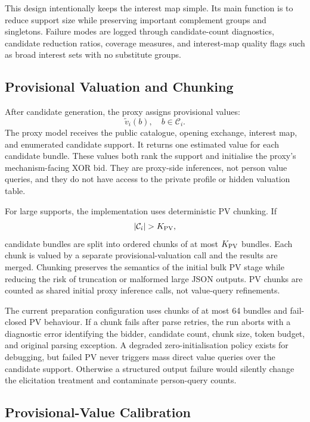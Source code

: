 This design intentionally keeps the interest map simple. Its main function is to reduce support size while preserving important complement groups and singletons. Failure modes are logged through candidate-count diagnostics, candidate reduction ratios, coverage measures, and interest-map quality flags such as broad interest sets with no substitute groups.

\subsection{Provisional Valuation and Chunking}

After candidate generation, the proxy assigns provisional values:
\[
\tilde v_i(b),\quad b\in\mathcal{C}_i.
\]
The proxy model receives the public catalogue, opening exchange, interest
map, and enumerated candidate support. It returns one estimated value for
each candidate bundle. These values both rank the support and initialise the
proxy's mechanism-facing XOR bid. They are proxy-side inferences, not person
value queries, and they do not have access to the private profile or hidden
valuation table.

For large supports, the implementation uses deterministic PV chunking. If
\[
|\mathcal{C}_i|>K_{\PV},
\]
candidate bundles are split into ordered chunks of at most \(K_{\operatorname{PV}}\) bundles. Each chunk is valued by a separate provisional-valuation call and the results are merged. Chunking preserves the semantics of the initial bulk PV stage while reducing the risk of truncation or malformed large JSON outputs. PV chunks are counted as shared initial proxy inference calls, not value-query refinements.

The current preparation configuration uses chunks of at most 64 bundles and
fail-closed PV behaviour. If a chunk fails after parse retries, the run
aborts with a diagnostic error identifying the bidder, candidate count,
chunk size, token budget, and original parsing exception. A degraded
zero-initialisation policy exists for debugging, but failed PV never triggers
mass direct value queries over the candidate support. Otherwise a structured
output failure would silently change the elicitation treatment and
contaminate person-query counts.

\subsection{Provisional-Value Calibration}

